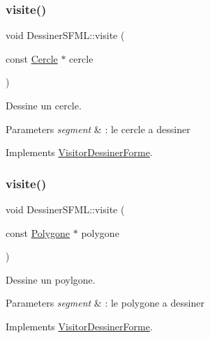 \subsubsection{\texorpdfstring{visite()}{visite()}\hspace{0.1cm}{\footnotesize\ttfamily [2/5]}}
{\footnotesize\ttfamily void Dessiner\+S\+F\+M\+L\+::visite (\begin{DoxyParamCaption}\item[{const \mbox{\hyperlink{class_cercle}{Cercle}} $\ast$}]{cercle }\end{DoxyParamCaption})\hspace{0.3cm}{\ttfamily [virtual]}}



Dessine un cercle. 


\begin{DoxyParams}{Parameters}
{\em segment} & \+: le cercle a dessiner \\
\hline
\end{DoxyParams}


Implements \mbox{\hyperlink{class_visitor_dessiner_forme}{Visitor\+Dessiner\+Forme}}.

\mbox{\label{class_dessiner_s_f_m_l_a8349e760caad82d54bd202d58cdc37fa}} 
\subsubsection{\texorpdfstring{visite()}{visite()}\hspace{0.1cm}{\footnotesize\ttfamily [3/5]}}
{\footnotesize\ttfamily void Dessiner\+S\+F\+M\+L\+::visite (\begin{DoxyParamCaption}\item[{const \mbox{\hyperlink{class_polygone}{Polygone}} $\ast$}]{polygone }\end{DoxyParamCaption})\hspace{0.3cm}{\ttfamily [virtual]}}



Dessine un poylgone. 


\begin{DoxyParams}{Parameters}
{\em segment} & \+: le polygone a dessiner \\
\hline
\end{DoxyParams}


Implements \mbox{\hyperlink{class_visitor_dessiner_forme}{Visitor\+Dessiner\+Forme}}.

